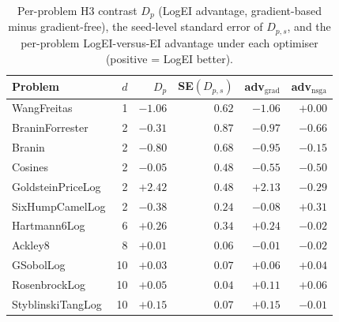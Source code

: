\begin{table}[t]
\centering
\caption{Per-problem H3 contrast $D_p$ (LogEI advantage, gradient-based minus gradient-free), the seed-level standard error of $D_{p,s}$, and the per-problem LogEI-versus-EI advantage under each optimiser (positive = LogEI better).}
\label{tab:appd-dp}
\small
\begin{tabular}{lrrrrr}
\toprule
Problem & $d$ & $D_p$ & SE$(D_{p,s})$ & adv$_{\mathrm{grad}}$ & adv$_{\mathrm{nsga}}$ \\
\midrule
WangFreitas & 1 & $-1.06$ & $0.62$ & $-1.06$ & $+0.00$ \\
BraninForrester & 2 & $-0.31$ & $0.87$ & $-0.97$ & $-0.66$ \\
Branin & 2 & $-0.80$ & $0.68$ & $-0.95$ & $-0.15$ \\
Cosines & 2 & $-0.05$ & $0.48$ & $-0.55$ & $-0.50$ \\
GoldsteinPriceLog & 2 & $+2.42$ & $0.48$ & $+2.13$ & $-0.29$ \\
SixHumpCamelLog & 2 & $-0.38$ & $0.24$ & $-0.08$ & $+0.31$ \\
Hartmann6Log & 6 & $+0.26$ & $0.34$ & $+0.24$ & $-0.02$ \\
Ackley8 & 8 & $+0.01$ & $0.06$ & $-0.01$ & $-0.02$ \\
GSobolLog & 10 & $+0.03$ & $0.07$ & $+0.06$ & $+0.04$ \\
RosenbrockLog & 10 & $+0.05$ & $0.04$ & $+0.11$ & $+0.06$ \\
StyblinskiTangLog & 10 & $+0.15$ & $0.07$ & $+0.15$ & $-0.01$ \\
\bottomrule
\end{tabular}
\end{table}
